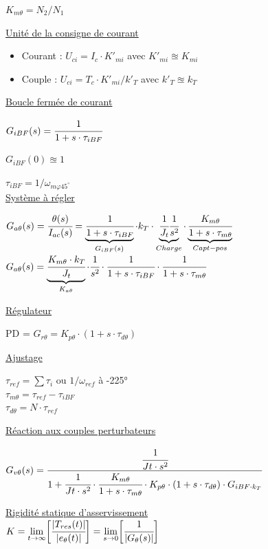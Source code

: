 \documentclass[	DIV=calc,%
							paper=a4,%
							fontsize=10pt,%
							twocolumn]{scrartcl} %
\begin{document}
$K_{m\theta} = N_2/N_1$

\underline{Unité de la consigne de courant}

\begin{itemize}
    \item Courant : $U_{ci} = I_c \cdot K'_{mi}$ avec $K'_{mi} \approxeq K_{mi}$
    \item Couple  : $U_{ci} = T_c \cdot K'_{mi}/k'_T$ avec $k'_T \approxeq k _T$
\end{itemize}


\underline{Boucle fermée de courant}

$G_{iBF}(s) = \cfrac{1}{1+s\cdot\tau_{iBF}} $

$G_{iBF}(0) \approxeq 1$

 $\tau_{iBF} = 1/ \omega_{m\varphi 45^\circ}$ \\

\underline{Système à régler}

$G_{a\theta}(s) = \cfrac{\theta(s)}{I_{ac}(s)} = \underbrace{\cfrac{1}{1+s\cdot\tau_{iBF}}}_{G_{iBF}(s)}\cdot k_T \cdot \underbrace{\cfrac{1}{J_t}\cfrac{1}{s^2}}_{Charge} \cdot \underbrace{\cfrac{K_{m\theta}}{1+s\cdot\tau_{m\theta}}}_{Capt-pos} $ 
$G_{a\theta}(s) = \underbrace{\cfrac{K_{m\theta} \cdot k_T}{J_t}}_{K_{a\theta} }\cdot \cfrac{1}{s^2}\cdot \cfrac{1}{1+s\cdot\tau_{iBF}} \cdot \cfrac{1}{1+s\cdot\tau_{m\theta}}$

\underline{Régulateur}

PD = $G_{r\theta} = K_{p\theta} \cdot (1+s\cdot\tau_{d\theta})$

\underline{Ajustage}

$\tau_{ref} = \sum\tau_i \text{ ou } 1/\omega_{ref} $ à -225°\\

$\tau_{m\theta} = \tau_{ref} - \tau_{iBF}$\\

$\tau_{d\theta} = N \cdot \tau_{ref}$


\underline{Réaction aux couples perturbateurs}

\resizebox{.5\textwidth}{!}
{
$G_{v\theta}(s) = \cfrac{\cfrac{1}{Jt \cdot s^2}}{1+\cfrac{1}{Jt \cdot s^2}\cdot \cfrac{K_{m\theta}}{1+s\cdot\tau_{m\theta}} \cdot K_{p\theta} \cdot (1+s\cdot\tau_{d\theta}) \cdot G_{iBF\cdot k_T}}$
}
\newpage


\underline{Rigidité statique d’asservissement}\\

$K = \lim\limits_{t \rightarrow \infty} \biggl[\cfrac{|T_{res}(t)|}{|e_\theta(t)|}\biggr] = \lim\limits_{s \rightarrow 0} \biggl[\cfrac{1}{|G_{\theta}(s)|}\biggr]$\\
\end{document}
